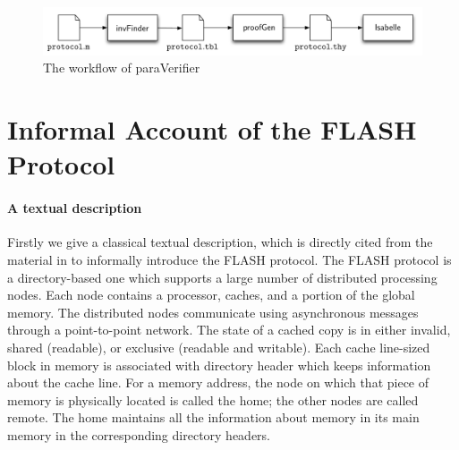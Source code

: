 \documentclass{llncs-new}
\newcommand{\bedt}[1]{{\color{black}#1}}
\begin{document}
\vspace{-20pt}
\begin{figure}[htbp]
\centering %
\includegraphics[width=1\textwidth]{paraVerifier.pdf}
\vspace{-20pt}
\caption{The workflow of {\sf paraVerifier} \label{fig:archParaVerifier}
}
\end{figure}
\vspace{-30pt}

\section{Informal Account of the FLASH Protocol\label{sec:informalOfFLASH}}
\vspace{-5pt}
\paragraph*{A textual description}Firstly we give a classical textual description, which is directly cited from the material in \cite{Park2000} to informally introduce the FLASH protocol. The FLASH protocol  is a directory-based one which supports a large number of distributed processing nodes. Each node contains a processor, caches, and
a portion of the global memory. The distributed nodes communicate using asynchronous
messages through a point-to-point network. The state of a cached copy is in either invalid,
shared (readable), or exclusive (readable and writable). Each cache line-sized block in memory is associated with directory header which keeps information about the \bedt{cache} line.  For a memory \bedt{address}, the
node on which that piece of memory is physically located is called the home; the other
nodes are called remote. The home maintains all the information about memory in
its main memory in the corresponding directory headers.
\end{document}
